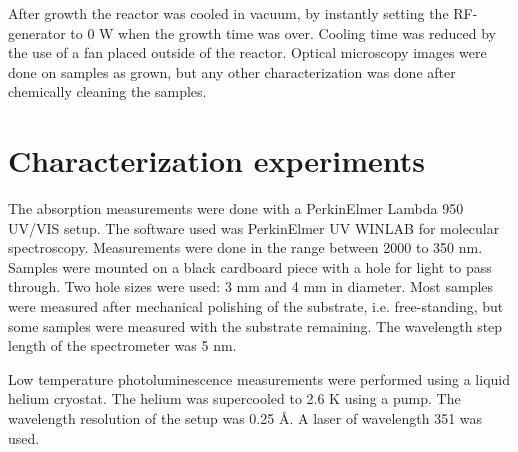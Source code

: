 After growth the reactor was cooled in vacuum, by instantly setting the RF-generator to 0 W when the growth time was over. Cooling time was reduced by the use of a fan placed outside of the reactor. Optical microscopy images were done on samples as grown, but any other characterization was done after chemically cleaning the samples. 

\section{Characterization experiments}
\label{sec:experimental:characterization}
The absorption measurements were done with a PerkinElmer Lambda 950 UV/VIS setup. The software used was PerkinElmer UV WINLAB for molecular spectroscopy. Measurements were done in the range between 2000 to 350 nm. Samples were mounted on a black cardboard piece with a hole for light to pass through. Two hole sizes were used: 3 mm and 4 mm in diameter. Most samples were measured after mechanical polishing of the substrate, i.e. free-standing, but some samples were measured with the substrate remaining. The wavelength step length of the spectrometer was 5 nm. 

Low temperature photoluminescence measurements were performed using a liquid helium cryostat. The helium was supercooled to 2.6 K using a pump. The wavelength resolution of the setup was 0.25 Å. A laser of wavelength 351 was used. 








































